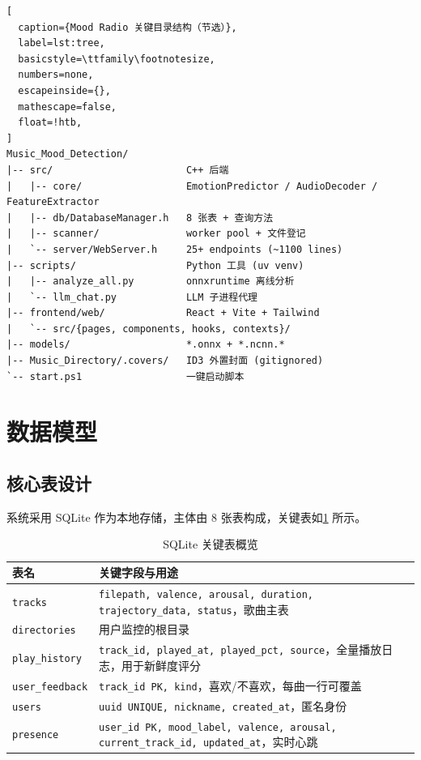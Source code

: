 \begin{lstlisting}[
  caption={Mood Radio 关键目录结构（节选）},
  label=lst:tree,
  basicstyle=\ttfamily\footnotesize,
  numbers=none,
  escapeinside={},
  mathescape=false,
  float=!htb,
]
Music_Mood_Detection/
|-- src/                       C++ 后端
|   |-- core/                  EmotionPredictor / AudioDecoder / FeatureExtractor
|   |-- db/DatabaseManager.h   8 张表 + 查询方法
|   |-- scanner/               worker pool + 文件登记
|   `-- server/WebServer.h     25+ endpoints (~1100 lines)
|-- scripts/                   Python 工具 (uv venv)
|   |-- analyze_all.py         onnxruntime 离线分析
|   `-- llm_chat.py            LLM 子进程代理
|-- frontend/web/              React + Vite + Tailwind
|   `-- src/{pages, components, hooks, contexts}/
|-- models/                    *.onnx + *.ncnn.*
|-- Music_Directory/.covers/   ID3 外置封面 (gitignored)
`-- start.ps1                  一键启动脚本
\end{lstlisting}

\section{数据模型}

\subsection{核心表设计}

系统采用 SQLite 作为本地存储，主体由 8 张表构成，关键表如\cref{tab:tables} 所示。

\begin{table}[!htb]
  \centering
  \caption{SQLite 关键表概览}\label{tab:tables}
  \begin{tabularx}{\linewidth}{lX}
    \toprule
    \textbf{表名} & \textbf{关键字段与用途} \\
    \midrule
    \texttt{tracks}        & \texttt{filepath, valence, arousal, duration, trajectory\_data, status}，歌曲主表 \\
    \texttt{directories}   & 用户监控的根目录 \\
    \texttt{play\_history} & \texttt{track\_id, played\_at, played\_pct, source}，全量播放日志，用于新鲜度评分 \\
    \texttt{user\_feedback}& \texttt{track\_id PK, kind}，喜欢/不喜欢，每曲一行可覆盖 \\
    \texttt{users}         & \texttt{uuid UNIQUE, nickname, created\_at}，匿名身份 \\
    \texttt{presence}      & \texttt{user\_id PK, mood\_label, valence, arousal, current\_track\_id, updated\_at}，实时心跳 \\
    \bottomrule
  \end{tabularx}
\end{table}

